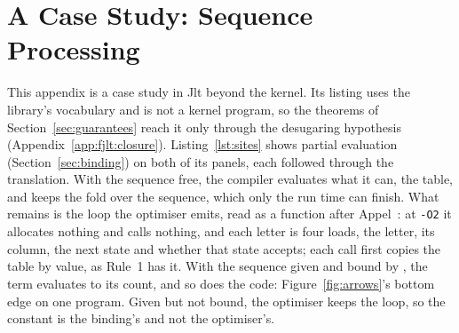\section{A Case Study: Sequence Processing}
\label{app:measurements}

This appendix is a case study in Jlt beyond the kernel.
Its listing uses the library's vocabulary and is not a kernel program, so the theorems of Section~\ref{sec:guarantees} reach it only through the desugaring hypothesis (Appendix~\ref{app:fjlt:closure}).
Listing~\ref{lst:sites} shows partial evaluation (Section~\ref{sec:binding}) on both of its panels, each followed through the translation.
With the sequence free, the compiler evaluates what it can, the table, and keeps the fold over the sequence, which only the run time can finish.
What remains is the loop the optimiser emits, read as a function after Appel~\cite{appel1998ssa}: at \texttt{-O2} it allocates nothing and calls nothing, and each letter is four loads, the letter, its column, the next state and whether that state accepts; each call first copies the table by value, as Rule~1 has it.
With the sequence given and bound by , the term evaluates to its count, and so does the code: Figure~\ref{fig:arrows}'s bottom edge on one program.
Given but not bound, the optimiser keeps the loop, so the constant is the binding's and not the optimiser's.

